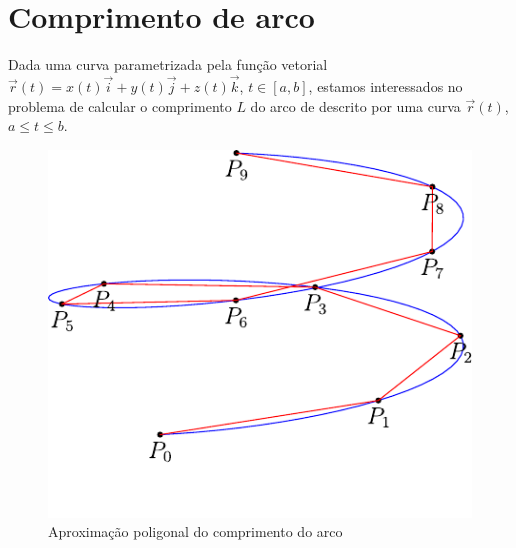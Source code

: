 \section{Comprimento de arco}
Dada uma curva parametrizada pela função vetorial $\vec{r}(t)=x(t)\vec{i}+y(t)\vec{j}+z(t)\vec{k}$, $t\in[a,b]$, estamos interessados no problema de calcular o comprimento $L$ do arco de descrito por uma curva $\vec{r}(t)$, $a\leq t\leq b$.
  
\begin{figure}
\centering
    \includegraphics{./cap_curvas/figs/helice_retificacao}
\caption{Aproximação poligonal do comprimento do arco}\label{fig_compr_arc}
\end{figure}

 
 
